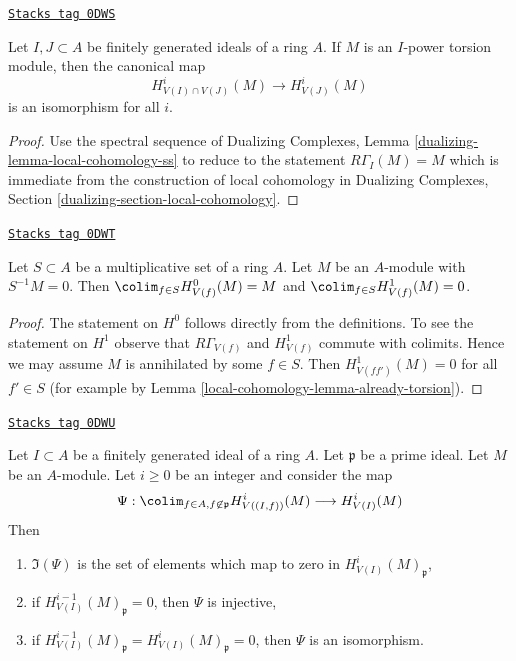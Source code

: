 \begin{lemma}
\label{local-cohomology-lemma-already-torsion}
\href{https://stacks.math.columbia.edu/tag/0DWS}{\texttt{Stacks tag 0DWS}}

Let $I, J \subset A$ be finitely generated ideals of a ring $A$.
If $M$ is an $I$-power torsion module, then the
canonical map
$$
H^i_{V(I) \cap V(J)}(M) \to H^i_{V(J)}(M)
$$
is an isomorphism for all $i$.
\end{lemma}

\begin{proof}
Use the spectral sequence of
Dualizing Complexes, Lemma \ref{dualizing-lemma-local-cohomology-ss}
to reduce to the statement $R\Gamma_I(M) = M$ which is immediate
from the construction of local cohomology
in Dualizing Complexes, Section \ref{dualizing-section-local-cohomology}.
\end{proof}

\begin{lemma}[Multiplicative]
\label{local-cohomology-lemma-multiplicative}
\href{https://stacks.math.columbia.edu/tag/0DWT}{\texttt{Stacks tag 0DWT}}

Let $S \subset A$ be a multiplicative set of a ring $A$.
Let $M$ be an $A$-module with $S^{-1}M = 0$. Then
$\colim_{f \in S} H^0_{V(f)}(M) = M$ and
$\colim_{f \in S} H^1_{V(f)}(M) = 0$.
\end{lemma}

\begin{proof}
The statement on $H^0$ follows directly from the definitions.
To see the statement on $H^1$ observe that $R\Gamma_{V(f)}$
and $H^1_{V(f)}$ commute with colimits. Hence we may assume
$M$ is annihilated by some $f \in S$. Then
$H^1_{V(ff')}(M) = 0$ for all $f' \in S$ (for example by
Lemma \ref{local-cohomology-lemma-already-torsion}).
\end{proof}

\begin{lemma}
\label{local-cohomology-lemma-elements-come-from-bigger}
\href{https://stacks.math.columbia.edu/tag/0DWU}{\texttt{Stacks tag 0DWU}}

Let $I \subset A$ be a finitely generated ideal of a ring $A$.
Let $\mathfrak p$ be a prime ideal. Let $M$ be an $A$-module.
Let $i \geq 0$ be an integer and consider the map
$$
\Psi :
\colim_{f \in A, f \not \in \mathfrak p} H^i_{V((I, f))}(M)
\longrightarrow
H^i_{V(I)}(M)
$$
Then
\begin{enumerate}
\item $\Im(\Psi)$ is the set of elements which map to zero in
$H^i_{V(I)}(M)_\mathfrak p$,
\item if $H^{i - 1}_{V(I)}(M)_\mathfrak p = 0$, then $\Psi$ is injective,
\item if $H^{i - 1}_{V(I)}(M)_\mathfrak p = H^i_{V(I)}(M)_\mathfrak p = 0$,
then $\Psi$ is an isomorphism.
\end{enumerate}
\end{lemma}

